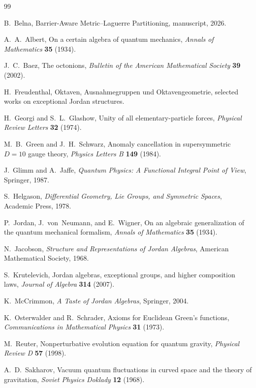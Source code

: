 \documentclass[11pt]{article}
\theoremstyle{plain}
\theoremstyle{definition}
\theoremstyle{remark}
\begin{document}
\begin{thebibliography}{99}

B.~Belna,
Barrier-Aware Metric--Laguerre Partitioning,
manuscript, 2026.

A.~A.~Albert,
On a certain algebra of quantum mechanics,
\emph{Annals of Mathematics} \textbf{35} (1934).

J.~C.~Baez,
The octonions,
\emph{Bulletin of the American Mathematical Society} \textbf{39} (2002).

H.~Freudenthal,
Oktaven, Ausnahmegruppen und Oktavengeometrie,
selected works on exceptional Jordan structures.

H.~Georgi and S.~L.~Glashow,
Unity of all elementary-particle forces,
\emph{Physical Review Letters} \textbf{32} (1974).

M.~B.~Green and J.~H.~Schwarz,
Anomaly cancellation in supersymmetric $D=10$ gauge theory,
\emph{Physics Letters B} \textbf{149} (1984).

J.~Glimm and A.~Jaffe,
\emph{Quantum Physics: A Functional Integral Point of View},
Springer, 1987.

S.~Helgason,
\emph{Differential Geometry, Lie Groups, and Symmetric Spaces},
Academic Press, 1978.

P.~Jordan, J.~von~Neumann, and E.~Wigner,
On an algebraic generalization of the quantum mechanical formalism,
\emph{Annals of Mathematics} \textbf{35} (1934).

N.~Jacobson,
\emph{Structure and Representations of Jordan Algebras},
American Mathematical Society, 1968.

S.~Krutelevich,
Jordan algebras, exceptional groups, and higher composition laws,
\emph{Journal of Algebra} \textbf{314} (2007).

K.~McCrimmon,
\emph{A Taste of Jordan Algebras},
Springer, 2004.

K.~Osterwalder and R.~Schrader,
Axioms for Euclidean Green's functions,
\emph{Communications in Mathematical Physics} \textbf{31} (1973).

M.~Reuter,
Nonperturbative evolution equation for quantum gravity,
\emph{Physical Review D} \textbf{57} (1998).

A.~D.~Sakharov,
Vacuum quantum fluctuations in curved space and the theory of gravitation,
\emph{Soviet Physics Doklady} \textbf{12} (1968).


\end{thebibliography}
\end{document}
